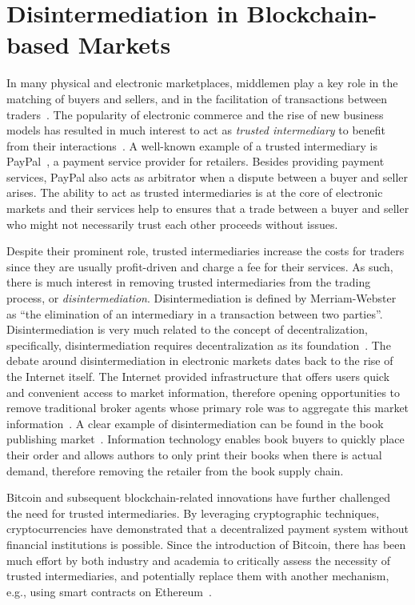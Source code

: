 \section{Disintermediation in Blockchain-based Markets}
In many physical and electronic marketplaces, middlemen play a key role in the matching of buyers and sellers, and in the facilitation of transactions between traders~\cite{bakos1998emerging}.
The popularity of electronic commerce and the rise of new business models has resulted in much interest to act as \emph{trusted intermediary} to benefit from their interactions~\cite{clark1999electronic}.
A well-known example of a trusted intermediary is PayPal~\cite{paypal}, a payment service provider for retailers.
Besides providing payment services, PayPal also acts as arbitrator when a dispute between a buyer and seller arises.
The ability to act as trusted intermediaries is at the core of electronic markets and their services help to ensures that a trade between a buyer and seller who might not necessarily trust each other proceeds without issues.

Despite their prominent role, trusted intermediaries increase the costs for traders since they are usually profit-driven and charge a fee for their services.
As such, there is much interest in removing trusted intermediaries from the trading process, or \emph{disintermediation}.
Disintermediation is defined by Merriam-Webster as \enquote{the elimination of an intermediary in a transaction between two parties}.
Disintermediation is very much related to the concept of decentralization, specifically, disintermediation requires decentralization as its foundation~\cite{guo2016blockchain}.
The debate around disintermediation in electronic markets dates back to the rise of the Internet itself. %
The Internet provided infrastructure that offers users quick and convenient access to market information, therefore opening opportunities to remove traditional broker agents whose primary role was to aggregate this market information~\cite{wigand2020whatever}.
A clear example of disintermediation can be found in the book publishing market~\cite{giaglis1999disintermediation}.
Information technology enables book buyers to quickly place their order and allows authors to only print their books when there is actual demand, therefore removing the retailer from the book supply chain.

Bitcoin and subsequent blockchain-related innovations have further challenged the need for trusted intermediaries.
By leveraging cryptographic techniques, cryptocurrencies have demonstrated that a decentralized payment system without financial institutions is possible.
Since the introduction of Bitcoin, there has been much effort by both industry and academia to critically assess the necessity of trusted intermediaries, and potentially replace them with another mechanism, e.g., using smart contracts on Ethereum~\cite{lande2018sok}.

